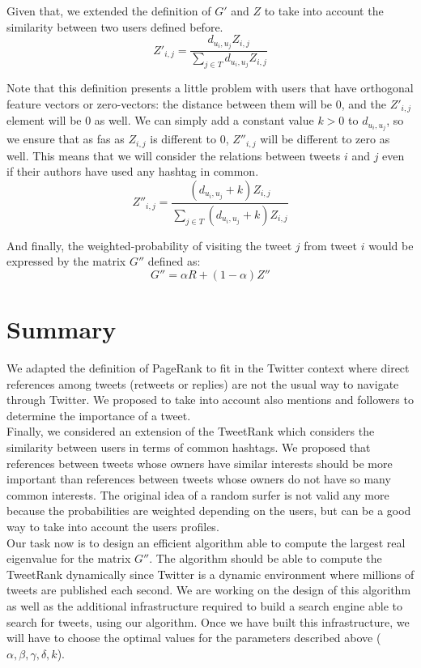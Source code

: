 \documentclass[12pt,a4paper]{article}
\begin{document}
Given that, we extended the definition of $G'$ and $Z$ to take into account the similarity between two users defined before. 
\begin{equation}
Z'_{i,j} = \frac{d_{u_i,u_j} Z_{i,j}}{\sum_{j \in T}{d_{u_i,u_j} Z_{i,j}}}
\end{equation}

Note that this definition presents a little problem with users that have orthogonal feature vectors or zero-vectors: the distance between them will be 0, and the $Z'_{i,j}$ element will be 0 as well. We can simply add a constant value $k > 0$ to $d_{u_i,u_j}$, so we ensure that as fas as $Z_{i,j}$ is different to 0, $Z''_{i,j}$ will be different to zero as well. This means that we will consider the relations between tweets $i$ and $j$ even if their authors have used any hashtag in common.
\begin{equation}
Z''_{i,j} = \frac{ (d_{u_i,u_j} + k) Z_{i,j}}{\sum_{j \in T}{(d_{u_i,u_j} + k) Z_{i,j}}}
\end{equation}

And finally, the weighted-probability of visiting the tweet $j$ from tweet $i$ would be expressed by the matrix $G''$ defined as:
\begin{equation}
G'' = \alpha R + (1 - \alpha) Z''
\end{equation}

\section{Summary}
We adapted the definition of PageRank to fit in the Twitter context where direct references among tweets (retweets or replies) are not the usual way to navigate through Twitter. We proposed to take into account also mentions and followers to determine the importance of a tweet. \\

Finally, we considered an extension of the TweetRank which considers the similarity between users in terms of common hashtags. We proposed that references between tweets whose owners have similar interests should be more important than references between tweets whose owners do not have so many common interests. The original idea of a random surfer is not valid any more because the probabilities are weighted depending on the users, but can be a good way to take into account the users profiles. \\

Our task now is to design an efficient algorithm able to compute the largest real eigenvalue for the matrix $G''$. The algorithm should be able to compute the TweetRank dynamically since Twitter is a dynamic environment where millions of tweets are published each second. We are working on the design of this algorithm as well as the additional infrastructure required to build a search engine able to search for tweets, using our algorithm. Once we have built this infrastructure, we will have to choose the optimal values for the parameters described above ($\alpha, \beta, \gamma, \delta, k$).
\end{document}
